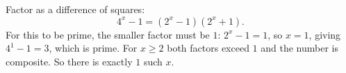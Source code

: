 Factor as a difference of squares:
\[4^x-1=\left(2^x-1\right)\left(2^x+1\right).\]
For this to be prime, the smaller factor must be $1$: $2^x-1=1$, so $x=1$, giving $4^1-1=3$, which is prime. For $x\ge2$ both factors exceed $1$ and the number is composite. So there is exactly $\boxed{1}$ such $x$.
